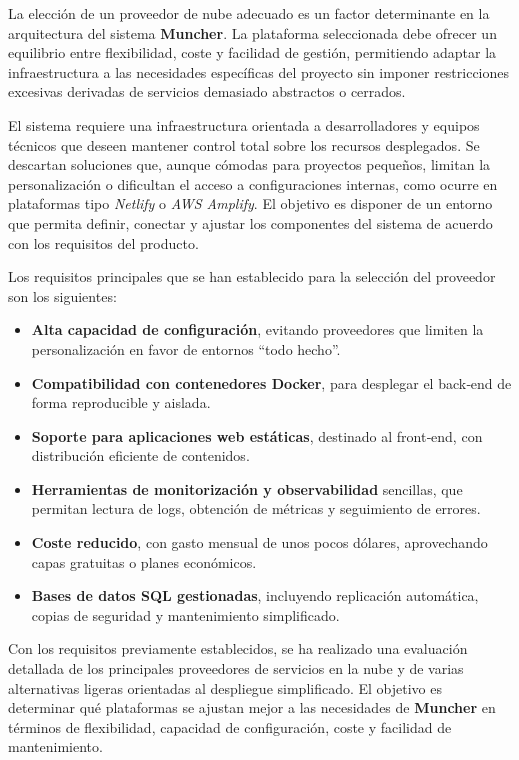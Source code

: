 La elección de un proveedor de nube adecuado es un factor determinante en la arquitectura del sistema \textbf{Muncher}. La plataforma seleccionada debe ofrecer un equilibrio entre flexibilidad, coste y facilidad de gestión, permitiendo adaptar la infraestructura a las necesidades específicas del proyecto sin imponer restricciones excesivas derivadas de servicios demasiado abstractos o cerrados.

El sistema requiere una infraestructura orientada a desarrolladores y equipos técnicos que deseen mantener control total sobre los recursos desplegados. Se descartan soluciones que, aunque cómodas para proyectos pequeños, limitan la personalización o dificultan el acceso a configuraciones internas, como ocurre en plataformas tipo \textit{Netlify} o \textit{AWS Amplify}. El objetivo es disponer de un entorno que permita definir, conectar y ajustar los componentes del sistema de acuerdo con los requisitos del producto.

Los requisitos principales que se han establecido para la selección del proveedor son los siguientes:

\begin{itemize}
	\item \textbf{Alta capacidad de configuración}, evitando proveedores que limiten la personalización en favor de entornos “todo hecho”.
	\item \textbf{Compatibilidad con contenedores Docker}, para desplegar el back‑end de forma reproducible y aislada.
	\item \textbf{Soporte para aplicaciones web estáticas}, destinado al front‑end, con distribución eficiente de contenidos.
	\item \textbf{Herramientas de monitorización y observabilidad} sencillas, que permitan lectura de logs, obtención de métricas y seguimiento de errores.
	\item \textbf{Coste reducido}, con gasto mensual de unos pocos dólares, aprovechando capas gratuitas o planes económicos.
	\item \textbf{Bases de datos SQL gestionadas}, incluyendo replicación automática, copias de seguridad y mantenimiento simplificado.
\end{itemize}

Con los requisitos previamente establecidos, se ha realizado una evaluación detallada de los principales proveedores de servicios en la nube y de varias alternativas ligeras orientadas al despliegue simplificado. El objetivo es determinar qué plataformas se ajustan mejor a las necesidades de \textbf{Muncher} en términos de flexibilidad, capacidad de configuración, coste y facilidad de mantenimiento.

